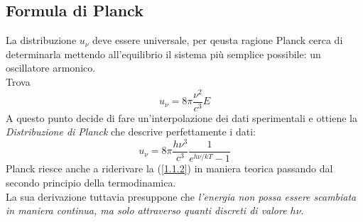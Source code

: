 \documentclass[twoside]{article}
\begin{document}
\subsection{Formula di Planck}
La distribuzione $u_{\nu}$ deve essere universale, per qeusta ragione Planck cerca di determinarla mettendo all'equilibrio il sistema più semplice possibile: un oscillatore armonico.
\\
Trova
\begin{equation}
    u_{\nu}=8\pi\frac{\nu^2}{c^3}E
\end{equation}
A questo punto decide di fare un'interpolazione dei dati sperimentali e ottiene la \textit{Distribuzione di Planck} che descrive perfettamente i dati:
\begin{equation} \label{1.1.2}
    u_{\nu}=8\pi \frac{h\nu^3}{c^3}\frac{1}{e^{h\nu/kT}-1}
\end{equation}
Planck riesce anche a riderivare la (\ref{1.1.2}) in maniera teorica passando dal secondo principio della termodinamica.
\\
La sua derivazione tuttavia presuppone che \textit{l'energia non possa essere scambiata in maniera continua, ma solo attraverso quanti discreti di valore $h\nu$}.
\end{document}
